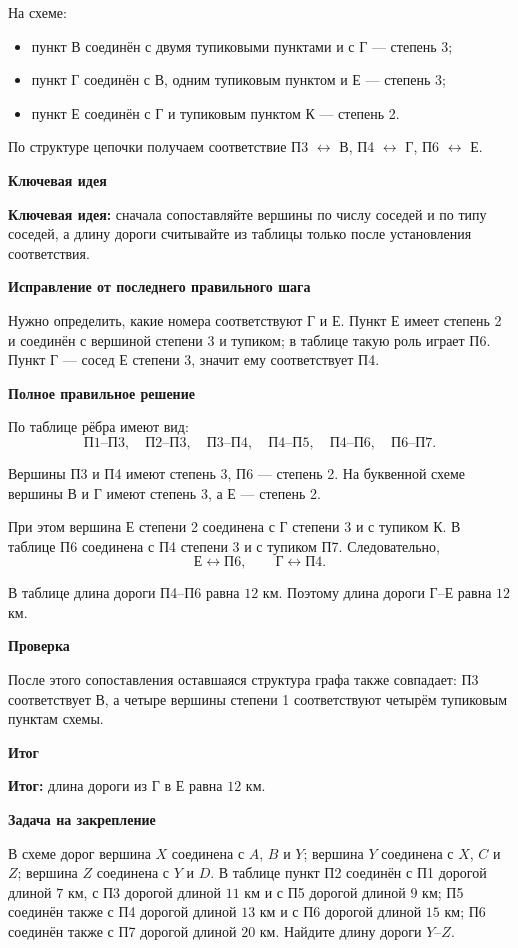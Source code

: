 \documentclass[12pt,a4paper]{article}
\newcommand{\keyidea}{\textcolor{blue!60!black}{\textbf{Ключевая идея:}}}
\newcommand{\resultlabel}{\textcolor{teal!60!black}{\textbf{Итог:}}}
\newcommand{\subhead}[1]{\par\medskip\textbf{#1}\par}
\begin{document}
На схеме:
\begin{itemize}
\item пункт В соединён с двумя тупиковыми пунктами и с Г --- степень 3;
\item пункт Г соединён с В, одним тупиковым пунктом и Е --- степень 3;
\item пункт Е соединён с Г и тупиковым пунктом К --- степень 2.
\end{itemize}

По структуре цепочки получаем соответствие П3 $\leftrightarrow$ В, П4 $\leftrightarrow$ Г, П6 $\leftrightarrow$ Е.

\subhead{Ключевая идея}
\keyidea{} сначала сопоставляйте вершины по числу соседей и по типу соседей, а длину дороги считывайте из таблицы только после установления соответствия.

\subhead{Исправление от последнего правильного шага}
Нужно определить, какие номера соответствуют Г и Е. Пункт Е имеет степень 2 и соединён с вершиной степени 3 и тупиком; в таблице такую роль играет П6. Пункт Г --- сосед Е степени 3, значит ему соответствует П4.

\subhead{Полное правильное решение}
По таблице рёбра имеют вид:
\[
\text{П1--П3},\quad \text{П2--П3},\quad \text{П3--П4},\quad
\text{П4--П5},\quad \text{П4--П6},\quad \text{П6--П7}.
\]

Вершины П3 и П4 имеют степень 3, П6 --- степень 2. На буквенной схеме вершины В и Г имеют степень 3, а Е --- степень 2.

При этом вершина Е степени 2 соединена с Г степени 3 и с тупиком К. В таблице П6 соединена с П4 степени 3 и с тупиком П7. Следовательно,
\[
\text{Е}\leftrightarrow\text{П6},\qquad
\text{Г}\leftrightarrow\text{П4}.
\]

В таблице длина дороги П4--П6 равна $12$ км. Поэтому длина дороги Г--Е равна $12$ км.

\subhead{Проверка}
После этого сопоставления оставшаяся структура графа также совпадает: П3 соответствует В, а четыре вершины степени 1 соответствуют четырём тупиковым пунктам схемы.

\subhead{Итог}
\resultlabel{} длина дороги из Г в Е равна $12$ км.

\subhead{Задача на закрепление}
В схеме дорог вершина $X$ соединена с $A$, $B$ и $Y$; вершина $Y$ соединена с $X$, $C$ и $Z$; вершина $Z$ соединена с $Y$ и $D$. В таблице пункт П2 соединён с П1 дорогой длиной $7$ км, с П3 дорогой длиной $11$ км и с П5 дорогой длиной $9$ км; П5 соединён также с П4 дорогой длиной $13$ км и с П6 дорогой длиной $15$ км; П6 соединён также с П7 дорогой длиной $20$ км. Найдите длину дороги $Y$--$Z$.
\end{document}
